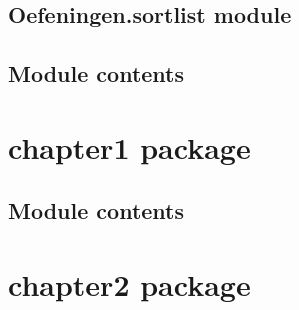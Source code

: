 \documentclass[letterpaper,10pt,english]{sphinxmanual}
\begin{document}

\begin{fulllineitems}
\label{\detokenize{Oefeningen:Oefeningen.lijsten.count_words}}
\pysigstartsignatures
{}
\pysigstopsignatures
\end{fulllineitems}



\subsection{Oefeningen.sortlist module}
\label{\detokenize{Oefeningen:module-Oefeningen.sortlist}}\label{\detokenize{Oefeningen:oefeningen-sortlist-module}}

\subsection{Module contents}
\label{\detokenize{Oefeningen:module-Oefeningen}}\label{\detokenize{Oefeningen:module-contents}}
\sphinxstepscope


\section{chapter1 package}
\label{\detokenize{chapter1:chapter1-package}}\label{\detokenize{chapter1::doc}}

\subsection{Module contents}
\label{\detokenize{chapter1:module-chapter1}}\label{\detokenize{chapter1:module-contents}}
\sphinxstepscope


\section{chapter2 package}
\label{\detokenize{chapter2:chapter2-package}}\label{\detokenize{chapter2::doc}}
\end{document}
